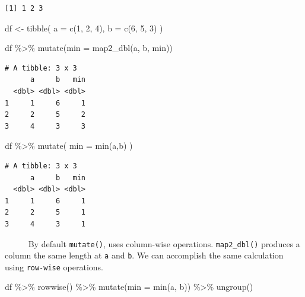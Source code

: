 \documentclass[
  letterpaper,
  DIV=11,
  numbers=noendperiod]{scrreprt}
\newenvironment{Shaded}{\begin{snugshade}}{\end{snugshade}}
\newcommand{\AttributeTok}[1]{\textcolor[rgb]{0.40,0.45,0.13}{#1}}
\newcommand{\DecValTok}[1]{\textcolor[rgb]{0.68,0.00,0.00}{#1}}
\newcommand{\FunctionTok}[1]{\textcolor[rgb]{0.28,0.35,0.67}{#1}}
\newcommand{\NormalTok}[1]{\textcolor[rgb]{0.00,0.23,0.31}{#1}}
\newcommand{\OtherTok}[1]{\textcolor[rgb]{0.00,0.23,0.31}{#1}}
\newcommand{\SpecialCharTok}[1]{\textcolor[rgb]{0.37,0.37,0.37}{#1}}
\begin{document}
\begin{verbatim}
[1] 1 2 3
\end{verbatim}

\begin{Shaded}
\begin{Highlighting}[]
\NormalTok{df }\OtherTok{\textless{}{-}}
    \FunctionTok{tibble}\NormalTok{(}
        \AttributeTok{a =} \FunctionTok{c}\NormalTok{(}\DecValTok{1}\NormalTok{, }\DecValTok{2}\NormalTok{, }\DecValTok{4}\NormalTok{),}
        \AttributeTok{b =} \FunctionTok{c}\NormalTok{(}\DecValTok{6}\NormalTok{, }\DecValTok{5}\NormalTok{, }\DecValTok{3}\NormalTok{)}
\NormalTok{        )}

\NormalTok{df }\SpecialCharTok{\%\textgreater{}\%}
    \FunctionTok{mutate}\NormalTok{(}\AttributeTok{min =} \FunctionTok{map2\_dbl}\NormalTok{(a, b, min))}
\end{Highlighting}
\end{Shaded}

\begin{verbatim}
# A tibble: 3 x 3
      a     b   min
  <dbl> <dbl> <dbl>
1     1     6     1
2     2     5     2
3     4     3     3
\end{verbatim}

\begin{Shaded}
\begin{Highlighting}[]
\NormalTok{df }\SpecialCharTok{\%\textgreater{}\%}
    \FunctionTok{mutate}\NormalTok{(}
        \AttributeTok{min =} \FunctionTok{min}\NormalTok{(a,b)}
\NormalTok{        )}
\end{Highlighting}
\end{Shaded}

\begin{verbatim}
# A tibble: 3 x 3
      a     b   min
  <dbl> <dbl> <dbl>
1     1     6     1
2     2     5     1
3     4     3     1
\end{verbatim}

~~~~~ By default \texttt{mutate()}, uses column-wise operations.
\texttt{map2\_dbl()} produces a column the same length at \texttt{a} and
\texttt{b}. We can accomplish the same calculation using
\texttt{row-wise} operations.

\begin{Shaded}
\begin{Highlighting}[]
\NormalTok{ df }\SpecialCharTok{\%\textgreater{}\%}
    \FunctionTok{rowwise}\NormalTok{() }\SpecialCharTok{\%\textgreater{}\%}
    \FunctionTok{mutate}\NormalTok{(}\AttributeTok{min =} \FunctionTok{min}\NormalTok{(a, b)) }\SpecialCharTok{\%\textgreater{}\%}
    \FunctionTok{ungroup}\NormalTok{()}
\end{Highlighting}
\end{Shaded}
\end{document}
